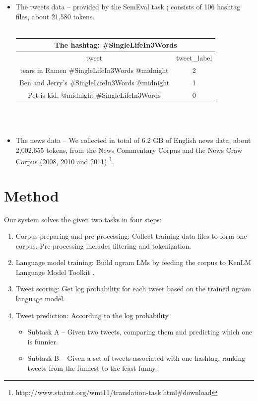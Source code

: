 \documentclass[a0,portrait]{a0poster}
\begin{document}
\begin{multicols}{2}
\begin{itemize}
\item The tweets data -- provided by the SemEval task ; consists of 106 hashtag files, about 21,580 tokens.\\\\
\begin{tabular}{ c | c } 
\toprule
\multicolumn{2}{c}{The hashtag:	\#SingleLifeIn3Words} \\
\hline
tweet & tweet\_label\\ 
\hline
tears in Ramen \#SingleLifeIn3Words @midnight & 2 \\ 
\hline
Ben and Jerry's \#SingleLifeIn3Words @midnight & 1 \\
\hline
Pet is kid. @midnight \#SingleLifeIn3Words & 0 \\
\bottomrule
\end{tabular}
\\\\
\item The news data -- We collected in total of 6.2 GB of English news data, about 2,002,655 tokens, from the News Commentary Corpus and the News Craw Corpus (2008, 2010 and 2011) \footnote{http://www.statmt.org/wmt11/translation-task.html\#download}.
\end{itemize}





\color{DarkSlateGray} %
\section*{\LARGE Method}
Our system solves the given two tasks in four steps:
\begin{enumerate}
\item Corpus preparing and pre-processing: Collect training data files to form one corpus. Pre-processing includes filtering and tokenization.
\item Language model training: Build ngram LMs by feeding the corpus to KenLM Language Model Toolkit \cite{Heafield-estimate}. 
\item Tweet scoring: Get log probability for each tweet based on the trained ngram language model.
\item Tweet prediction: According to the log probability
\begin{itemize}
\item Subtask A -- Given two tweets, comparing them and predicting which one is funnier. 
\item Subtask B -- Given a set of tweets associated with one hashtag, ranking tweets from the funnest to the least funny.
\end{itemize}
\end{enumerate}


\end{multicols}
\end{document}
